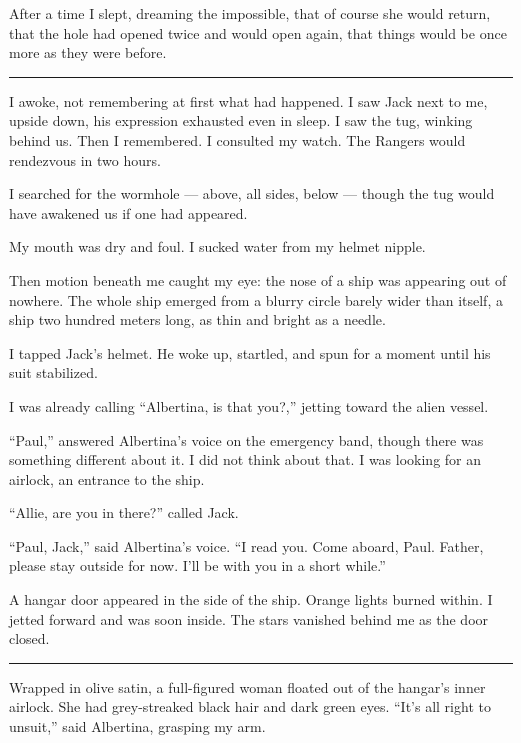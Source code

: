 \documentclass[english,11pt,letterpaper,onecolumn]{scrbook}
\begin{document}
	After a time I slept, dreaming the impossible, that of course she would return, that the hole had opened twice and would open again, that things would be once more as they were before.

\begin{center}\rule[3pt]{2in}{0.5pt}\end{center}

	I awoke, not remembering at first what had happened.  I saw Jack next to me, upside down, his expression exhausted even in sleep.  I saw the tug, winking behind us.  Then I remembered.  I consulted my watch.  The Rangers would rendezvous in two hours.  

	I searched for the wormhole --- above, all sides, below --- though the tug would have awakened us if one had appeared.  

	My mouth was dry and foul.  I sucked water from my helmet nipple.

	Then motion beneath me caught my eye:  the nose of a ship was appearing out of nowhere.  The whole ship emerged from a blurry circle barely wider than itself, a ship two hundred meters long, as thin and bright as a needle.

	I tapped Jack's helmet.  He woke up, startled, and spun for a moment until his suit stabilized.

	I was already calling ``Albertina, is that you?,'' jetting toward the alien vessel.

	``Paul,'' answered Albertina's voice on the emergency band, though there was something different about it.  I did not think about that.  I was looking for an airlock, an entrance to the ship.

	``Allie, are you in there?'' called Jack.

	``Paul, Jack,'' said Albertina's voice.  ``I read you.  Come aboard, Paul.  Father, please stay outside for now.  I'll be with you in a short while.''

	A hangar door appeared in the side of the ship.  Orange lights burned within.  I jetted forward and was soon inside.  The stars vanished behind me as the door closed.

\begin{center}\rule[3pt]{2in}{0.5pt}\end{center}

	Wrapped in olive satin, a full-figured woman floated out of the hangar's inner airlock.  She had grey-streaked black hair and dark green eyes.  ``It's all right to unsuit,'' said Albertina, grasping my arm.  
\end{document}
